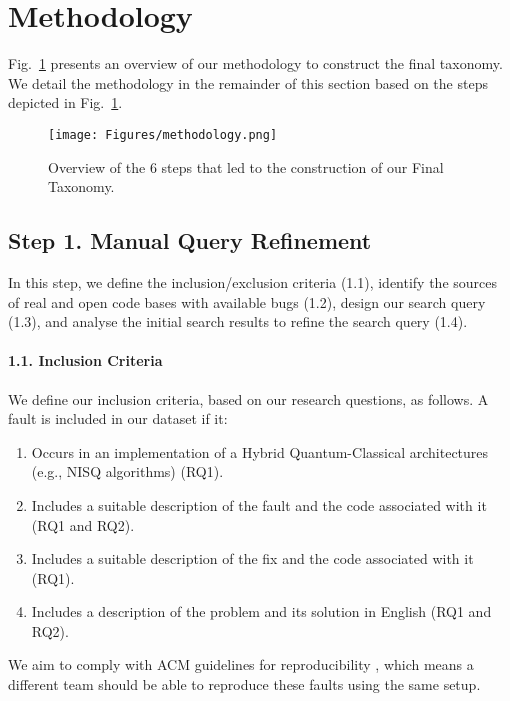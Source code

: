 \section{Methodology}
\label{methodology}

Fig.\ \ref{fig:methodology} presents an overview of our methodology to construct the final taxonomy. We detail the methodology in the remainder of this section based on the steps depicted in Fig.\ \ref{fig:methodology}.

\begin{figure}[htb!]
  \texttt{[image: Figures/methodology.png]}
  \caption{Overview of the 6 steps that led to the construction of our Final Taxonomy.}
  \label{fig:methodology}
\end{figure}


\subsection*{Step 1. Manual Query Refinement}

In this step, we define the inclusion/exclusion criteria (1.1), identify the sources of real and open code bases with available bugs (1.2), design our search query (1.3), and analyse the initial search results to refine the search query (1.4).


\paragraph*{1.1. Inclusion Criteria} 
We define our inclusion criteria, based on our research questions, as follows. A fault is included in our dataset if it:

\begin{enumerate}

\item Occurs in an implementation of a Hybrid Quantum-Classical architectures (e.g.,  NISQ algorithms) (RQ1).
\item Includes a suitable description of the fault and the code associated with it (RQ1 and RQ2).
\item Includes a suitable description of the fix and the code associated with it (RQ1).
\item Includes a description of the problem and its solution in English (RQ1 and RQ2). 

\end{enumerate}

We aim to comply with ACM guidelines for reproducibility \cite{noauthor_artifact_nodate}, which means a different team should be able to reproduce these faults using the same setup.\\

